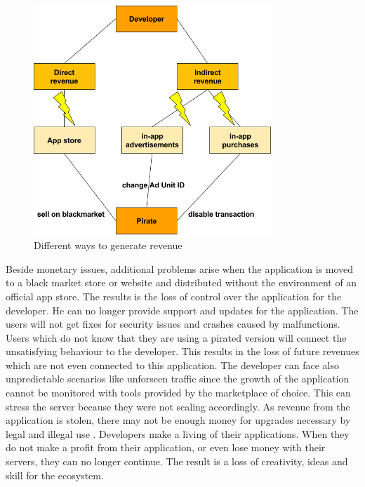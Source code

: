 \begin{figure}[h]
    \centering
    \includegraphics[width=0.8\textwidth]{data/revenue.png}
    \caption{Different ways to generate revenue}
    \label{fig:revenue}
\end{figure}
Beside monetary issues, additional problems arise when the application is moved to a black market store or website and distributed without the environment of an official app store.
The results is the loss of control over the application for the developer.
He can no longer provide support and updates for the application.
The users will not get fixes for security issues and crashes caused by malfunctions.
Users which do not know that they are using a pirated version will connect the unsatisfying behaviour to the developer.
This results in the loss of future revenues which are not even connected to this application.
\newline
The developer can face also unpredictable scenarios like unforseen traffic since the growth of the application cannot be monitored with tools provided by the marketplace of choice.
This can stress the server because they were not scaling accordingly.
As revenue from the application is stolen, there may not be enough money for upgrades necessary by legal and illegal use \cite{lierschDeveloperThreats}.
\newline
\newline
Developers make a living of their applications.
When they do not make a profit from their application, or even lose money with their servers, they can no longer continue.
The result is a loss of creativity, ideas and skill for the ecosystem.
